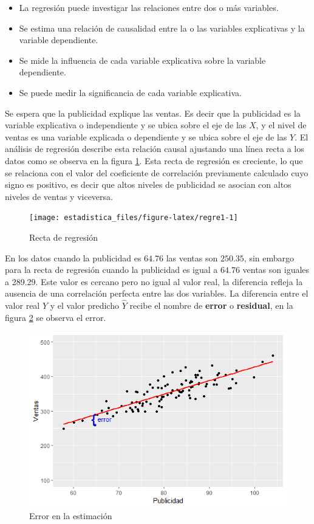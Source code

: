 \documentclass[]{book}
\providecommand{\tightlist}{%
  \setlength{\itemsep}{0pt}\setlength{\parskip}{0pt}}
\begin{document}
\begin{itemize}
\tightlist
\item
  La regresión puede investigar las relaciones entre dos o más variables.
\item
  Se estima una relación de causalidad entre la o las variables explicativas y la variable dependiente.
\item
  Se mide la influencia de cada variable explicativa sobre la variable dependiente.
\item
  Se puede medir la significancia de cada variable explicativa.
\end{itemize}

Se espera que la publicidad explique las ventas. Es decir que la publicidad es la variable explicativa o independiente y se ubica sobre el eje de las \(X\), y el nivel de ventas es una variable explicada o dependiente y se ubica sobre el eje de las \(Y\). El análisis de regresión describe esta relación causal ajustando una línea recta a los datos como se observa en la figura \ref{fig:regre1}. Esta recta de regresión es creciente, lo que se relaciona con el valor del coeficiente de correlación previamente calculado cuyo signo es positivo, es decir que altos niveles de publicidad se asocian con altos niveles de ventas y viceversa.

\begin{figure}[h]

{\centering \texttt{[image: estadistica\_files/figure-latex/regre1-1]} 

}

\caption{Recta de regresión}\label{fig:regre1}
\end{figure}

En los datos cuando la publicidad es \(64.76\) las ventas son \(250.35\), sin embargo para la recta de regresión cuando la publicidad es igual a \(64.76\) ventas son iguales a 289.29. Este valor es cercano pero no igual al valor real, la diferencia refleja la ausencia de una correlación perfecta entre las dos variables. La diferencia entre el valor real \(Y\) y el valor predicho \(\hat{Y}\) recibe el nombre de \textbf{error} o \textbf{residual}, en la figura \ref{fig:error1} se observa el error.

\begin{figure}[h]

{\centering \includegraphics[width=0.6\linewidth]{error} 

}

\caption{Error en la estimación}\label{fig:error1}
\end{figure}
\end{document}
